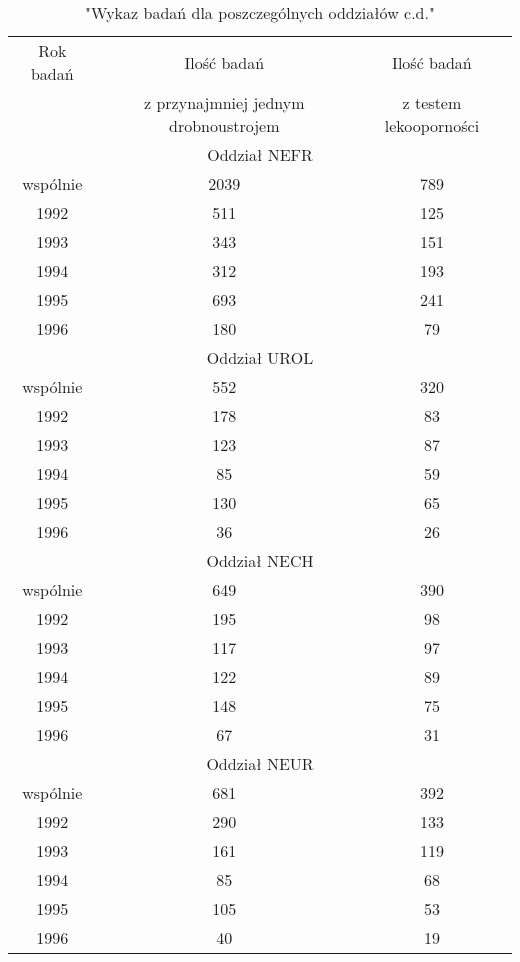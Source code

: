 \documentclass[a4paper,12pt]{article}
\begin{document}
\begin{table}[h]
\begin{center}
\caption{"Wykaz badań dla poszczególnych oddziałów c.d."}
\begin{tabular}{c|c|c}
\hline
Rok badań & Ilość badań & Ilość badań \\
& z przynajmniej jednym drobnoustrojem &z testem lekooporności \\

\hline \multicolumn{3}{|c|}{Oddział NEFR} \\ \hline
wspólnie &2039 &789 \\
1992 &511 &125 \\
1993 &343 &151 \\
1994 &312 &193 \\
1995 &693 &241 \\
1996 &180 &79 \\
\hline \multicolumn{3}{|c|}{Oddział UROL} \\ \hline
wspólnie &552 &320 \\
1992 &178 &83 \\
1993 &123 &87 \\
1994 &85 &59 \\
1995 &130 &65 \\
1996 &36 &26 \\
\hline \multicolumn{3}{|c|}{Oddział NECH} \\ \hline
wspólnie &649 &390 \\
1992 &195 &98 \\
1993 &117 &97 \\
1994 &122 &89 \\
1995 &148 &75 \\
1996 &67 &31 \\
\hline \multicolumn{3}{|c|}{Oddział NEUR} \\ \hline
wspólnie &681 &392 \\
1992 &290 &133 \\
1993 &161 &119 \\
1994 &85 &68 \\
1995 &105 &53 \\
1996 &40 &19 \\


\end{tabular}
\end{center}
\end{table}
\end{document}
